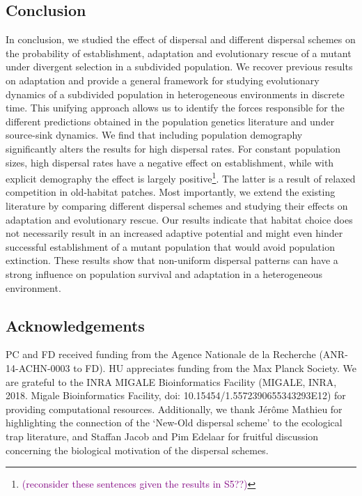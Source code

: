 \documentclass[11pt]{article}
\newcommand{\florence}[1]{\textcolor{purple}{(#1)}} %
\newcommand{\chg}[1]{\textcolor{change}{#1}}
\begin{document}
\subsection*{Conclusion}
In conclusion, we studied the effect of dispersal and different dispersal schemes on the probability of establishment, adaptation and evolutionary rescue of a mutant under divergent selection in a subdivided population. We recover previous results on adaptation and provide a general framework for studying evolutionary dynamics of a subdivided population in heterogeneous environments in discrete time. This unifying approach allows us to identify the forces responsible for the different predictions obtained in the population genetics literature and under source-sink dynamics. We find that including population demography significantly alters the results for high dispersal rates. For constant population sizes, high dispersal rates have a negative effect on establishment, while with explicit demography the effect is largely positive\footnote{\florence{reconsider these sentences given the results in S5??}}. The latter is a result of relaxed competition in old-habitat patches. Most importantly, we extend the existing literature by comparing different dispersal schemes and studying their effects on adaptation and evolutionary rescue. Our results indicate that habitat choice does not necessarily result in an increased adaptive potential and might even hinder successful establishment of a mutant population that would avoid population extinction.  %
These results show that non-\chg{uniform} dispersal patterns can have a strong influence on population survival and adaptation in a heterogeneous environment. 

\subsection*{Acknowledgements}
PC and FD received funding from the Agence Nationale de la Recherche (ANR-14-ACHN-0003 to FD). HU appreciates funding from the Max Planck Society. We are grateful to the INRA MIGALE Bioinformatics Facility (MIGALE, INRA, 2018. Migale Bioinformatics Facility, doi: 10.15454/1.5572390655343293E12) for providing computational resources. Additionally, we thank J\'{e}r\^{o}me Mathieu for highlighting the connection of the `New-Old dispersal scheme' to the ecological trap literature, and Staffan Jacob and Pim Edelaar for fruitful discussion concerning the biological motivation of the dispersal schemes. 
\end{document}
